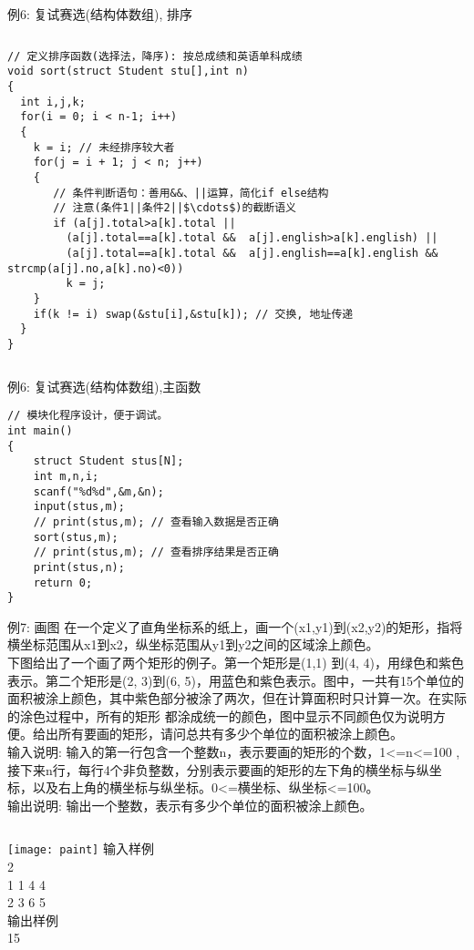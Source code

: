 \begin{frame}{例6: 复试赛选(结构体数组), 排序}
\vspace{-0.5cm}
\begin{columns}[T]
\begin{lstlisting}
// 定义排序函数(选择法，降序): 按总成绩和英语单科成绩 
void sort(struct Student stu[],int n)            
{
  int i,j,k;
  for(i = 0; i < n-1; i++) 
  {
    k = i; // 未经排序较大者
    for(j = i + 1; j < n; j++)
    {
       // 条件判断语句：善用&&、||运算，简化if else结构
       // 注意(条件1||条件2||$\cdots$)的截断语义
       if (a[j].total>a[k].total || 
         (a[j].total==a[k].total &&  a[j].english>a[k].english) || 
         (a[j].total==a[k].total &&  a[j].english==a[k].english && strcmp(a[j].no,a[k].no)<0))  
         k = j;
    }
    if(k != i) swap(&stu[i],&stu[k]); // 交换, 地址传递
  } 
}
\end{lstlisting}
\end{columns}
\medskip
\end{frame}

\begin{frame}{例6: 复试赛选(结构体数组),主函数}
\begin{lstlisting}
// 模块化程序设计，便于调试。
int main()
{
    struct Student stus[N]; 
    int m,n,i;
    scanf("%d%d",&m,&n);
    input(stus,m); 
    // print(stus,m); // 查看输入数据是否正确
    sort(stus,m);
    // print(stus,m); // 查看排序结果是否正确
    print(stus,n);
    return 0;
}
\end{lstlisting}
\end{frame}

\begin{frame}{例7: 画图}
在一个定义了直角坐标系的纸上，画一个(x1,y1)到(x2,y2)的矩形，指将横坐标范围从x1到x2，纵坐标范围从y1到y2之间的区域涂上颜色。\\ 
下图给出了一个画了两个矩形的例子。第一个矩形是(1,1) 到(4, 4)，用绿色和紫色表示。第二个矩形是(2, 3)到(6, 5)，用蓝色和紫色表示。图中，一共有15个单位的面积被涂上颜色，其中紫色部分被涂了两次，但在计算面积时只计算一次。在实际的涂色过程中，所有的矩形 都涂成统一的颜色，图中显示不同颜色仅为说明方便。给出所有要画的矩形，请问总共有多少个单位的面积被涂上颜色。 \\
输入说明: 输入的第一行包含一个整数n，表示要画的矩形的个数，1<=n<=100 ,接下来n行，每行4个非负整数，分别表示要画的矩形的左下角的横坐标与纵坐标，以及右上角的横坐标与纵坐标。0<=横坐标、纵坐标<=100。\\
输出说明: 输出一个整数，表示有多少个单位的面积被涂上颜色。
\begin{columns}[T]
	\texttt{[image: paint]}
	输入样例\\	
	2 \\
	1 1 4 4\\ 
	2 3 6 5 \\
	输出样例\\	
	15
\end{columns}
\medskip
\end{frame}

